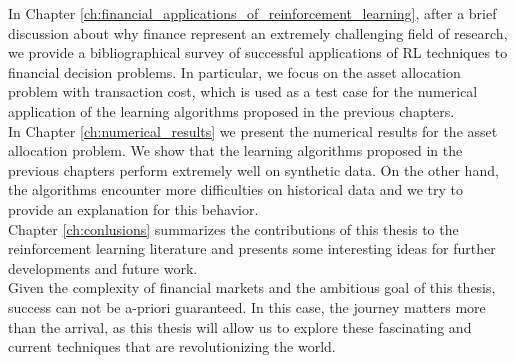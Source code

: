 In Chapter \ref{ch:financial_applications_of_reinforcement_learning}, after a brief discussion about why finance represent an extremely challenging field of research, we provide a bibliographical survey of successful applications of RL techniques to financial decision problems. In particular, we focus on the asset allocation problem with transaction cost, which is used as a test case for the numerical application of the learning algorithms proposed in the previous chapters.\\
In Chapter \ref{ch:numerical_results} we present the numerical results for the asset allocation problem. We show that the learning algorithms proposed in the previous chapters perform extremely well on synthetic data. On the other hand, the algorithms encounter more difficulties on historical data and we try to provide an explanation for this behavior.\\
Chapter \ref{ch:conlusions} summarizes the contributions of this thesis to the reinforcement learning literature and presents some interesting ideas for further developments and future work.\\
Given the complexity of financial markets and the ambitious goal of this thesis, success can not be a-priori guaranteed. In this case, the journey matters more than the arrival, as this thesis will allow us to explore these fascinating and current techniques that are revolutionizing the world.  


